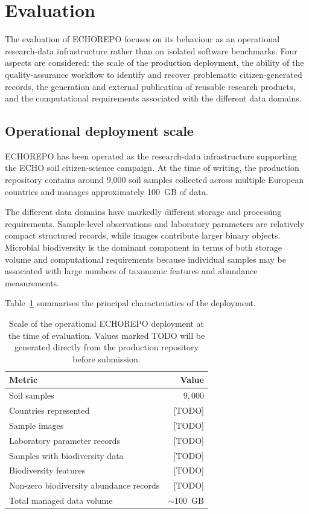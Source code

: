 \section{Evaluation}

The evaluation of ECHOREPO focuses on its behaviour as an operational
research-data infrastructure rather than on isolated software benchmarks.
Four aspects are considered: the scale of the production deployment,
the ability of the quality-assurance workflow to identify and recover
problematic citizen-generated records, the generation and external
publication of reusable research products, and the computational
requirements associated with the different data domains.

\subsection{Operational deployment scale}

ECHOREPO has been operated as the research-data infrastructure supporting
the ECHO soil citizen-science campaign. At the time of writing, the
production repository contains around 9,000 soil samples collected
across multiple European countries and manages approximately 100~GB of
data.

The different data domains have markedly different storage and processing
requirements. Sample-level observations and laboratory parameters are
relatively compact structured records, while images contribute larger
binary objects. Microbial biodiversity is the dominant component in terms
of both storage volume and computational requirements because individual
samples may be associated with large numbers of taxonomic features and
abundance measurements.

Table~\ref{tab:deployment-scale} summarises the principal characteristics
of the deployment.

\begin{table}[htbp]
    \centering
    \caption{Scale of the operational ECHOREPO deployment at the time of
    evaluation. Values marked TODO will be generated directly from the
    production repository before submission.}
    \label{tab:deployment-scale}
    \begin{tabular}{lr}
        \toprule
        Metric & Value \\
        \midrule
        Soil samples & $9{,}000$ \\
        Countries represented & [TODO] \\
        Sample images & [TODO] \\
        Laboratory parameter records & [TODO] \\
        Samples with biodiversity data & [TODO] \\
        Biodiversity features & [TODO] \\
        Non-zero biodiversity abundance records & [TODO] \\
        Total managed data volume & $\sim100$~GB \\
        \bottomrule
    \end{tabular}
\end{table}

